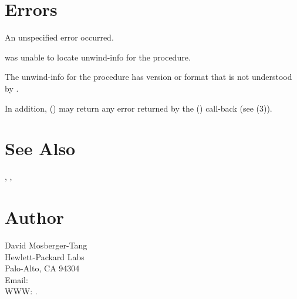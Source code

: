 \documentclass{article}
\begin{document}
\section{Errors}

\begin{Description}
\item[\Const{UNW\_EUNSPEC}] An unspecified error occurred.
\item[\Const{UNW\_ENOINFO}]  was unable to locate
  unwind-info for the procedure.
\item[\Const{UNW\_EBADVERSION}] The unwind-info for the procedure has
  version or format that is not understood by .
\end{Description}
In addition, () may return any error
returned by the () call-back (see
(3)).

\section{See Also}

,
,

\section{Author}

\noindent
David Mosberger-Tang\\
Hewlett-Packard Labs\\
Palo-Alto, CA 94304\\
Email: \\
WWW: .
\LatexManEnd
\end{document}
